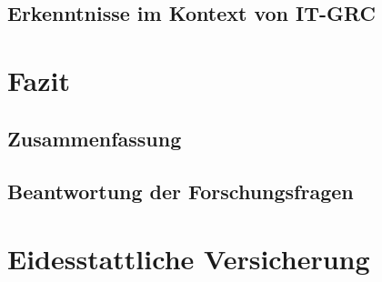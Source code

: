 \documentclass[10pt]{article}
\begin{document}
\subsection{Erkenntnisse im Kontext von IT-GRC}
\section{Fazit}
\subsection{Zusammenfassung}
\subsection{Beantwortung der Forschungsfragen}
\section{Eidesstattliche Versicherung}
\newpage
\printbibliography[notkeyword={quelle}, title={Literaturverzeichnis}]
\newpage
\printbibliography[keyword={quelle}, title={Quellenverzeichnis}]
\newpage
\listoffigures
\end{document}
